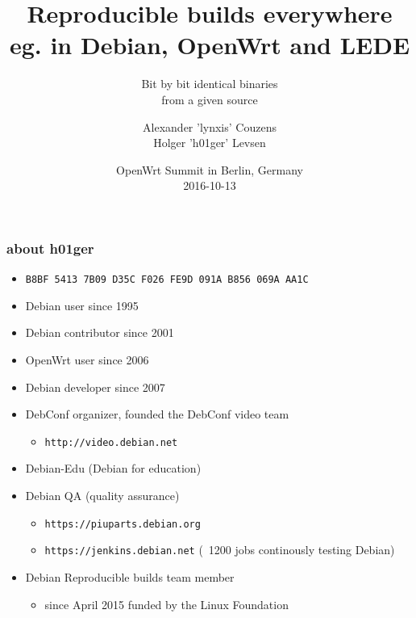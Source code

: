 \documentclass[14pt,aspectratio=169]{beamer}
\title[Reproducible builds everywhere]{Reproducible
builds everywhere \\ eg. in Debian, OpenWrt and LEDE}
\subtitle{Bit by bit identical binaries \\
from a given source}
\author[h01ger and lynxis]{%
   \texorpdfstring{
            \centering
            Alexander 'lynxis' Couzens\\
            Holger 'h01ger' Levsen
   }{h01ger and lynxis}}
\date[OpenWrt Summit, Berlin]{%
 OpenWrt Summit in Berlin, Germany\\
 \small{2016-10-13}}
\newif\ifplacelogo
\begin{document}
\begin{frame}[plain]
 \titlepage
\end{frame}

\begin{frame}
 \frametitle{about h01ger}

 \begin{itemize}
  \item \small{\texttt{B8BF 5413 7B09 D35C F026  FE9D 091A B856 069A AA1C}}
  \item Debian user since 1995
  \item Debian contributor since 2001
  \item OpenWrt user since 2006
  \item Debian developer since 2007
  \item DebConf organizer,
  founded the DebConf video team
   \begin{itemize}
    \item \texttt{http://video.debian.net}
   \end{itemize}
 \item Debian-Edu (Debian for education)
  \item Debian QA (quality assurance)
  \begin{itemize}
   \item \texttt{https://piuparts.debian.org}
   \item \texttt{https://jenkins.debian.net} (~1200 jobs continously testing Debian)
  \end{itemize}
  \item Debian Reproducible builds team member
  \begin{itemize}
   \item since April 2015 funded by the Linux Foundation
 \end{itemize}
 \end{itemize}
\end{frame}

\placelogofalse
\end{document}
